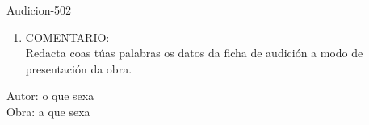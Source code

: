 \begin{defproblem}{Audicion-502}
\begin{ejercicio}[]
\begin{enumerate}[1.-]
\begin{multicols}{2}
\begin{enumerate}[a)]
				\small{
				Estamos ante:
				}
			\begin{itemize}
                \item
			     Música relixiosa (sacra)
                 \item
			     Música vocal relixiosa (música sacra)
			     \item
			     Música profana
			     \item
			     Canción profana (popular)
			\end{itemize}
		    \end{enumerate}
    \end{multicols}
    \item
    COMENTARIO:\\
    {\small Redacta coas túas palabras os datos da ficha de audición a modo de presentación da obra.}
    \par
    \vspace*{5.0cm}
	\end{enumerate}
\end{ejercicio}

\begin{onlysolution}
    \begin{solution}
Autor: o que sexa\\
Obra: a que sexa\\
    \end{solution}
\end{onlysolution}

\end{defproblem}
%
